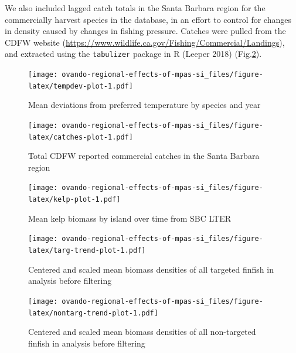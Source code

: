 \documentclass[]{article}
\begin{document}
We also included lagged catch totals in the Santa Barbara region for the commercially harvest species in the database, in an effort to control for changes in density caused by changes in fishing pressure. Catches were pulled from the CDFW website (\url{https://www.wildlife.ca.gov/Fishing/Commercial/Landings}), and extracted using the \texttt{tabulizer} package in R (Leeper 2018) (Fig.\ref{fig:catches-plot}).

\begin{figure}
\centering
\texttt{[image: ovando-regional-effects-of-mpas-si\_files/figure-latex/tempdev-plot-1.pdf]}
\caption{\label{fig:tempdev-plot}Mean deviations from preferred temperature by species and year}
\end{figure}

\begin{figure}
\centering
\texttt{[image: ovando-regional-effects-of-mpas-si\_files/figure-latex/catches-plot-1.pdf]}
\caption{\label{fig:catches-plot}Total CDFW reported commercial catches in the Santa Barbara region}
\end{figure}

\begin{figure}
\centering
\texttt{[image: ovando-regional-effects-of-mpas-si\_files/figure-latex/kelp-plot-1.pdf]}
\caption{\label{fig:kelp-plot}Mean kelp biomass by island over time from SBC LTER}
\end{figure}

\begin{figure}
\centering
\texttt{[image: ovando-regional-effects-of-mpas-si\_files/figure-latex/targ-trend-plot-1.pdf]}
\caption{\label{fig:targ-trend-plot}Centered and scaled mean biomass densities of all targeted finfish in analysis before filtering}
\end{figure}

\begin{figure}
\centering
\texttt{[image: ovando-regional-effects-of-mpas-si\_files/figure-latex/nontarg-trend-plot-1.pdf]}
\caption{\label{fig:nontarg-trend-plot}Centered and scaled mean biomass densities of all non-targeted finfish in analysis before filtering}
\end{figure}
\end{document}
